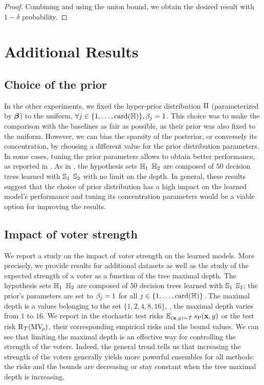 \begin{noaddcontents}
\begin{proof}
Combining  and  using the union bound, we obtain the desired result with $1-\delta$ probability.
\end{proof}

\section{Additional Results}
\label{ap:mv-sto:sec:result}

\subsection{Choice of the prior}
In the other experiments, we fixed the hyper-prior distribution $\hyperP$ (parameterized by $\paramDirP$) to the uniform, \ie $\forall j\in\{1,\dots,\card(\H)\}, \sparamDirP_j = 1$.
This choice was to make the comparison with the baselines as fair as possible, as their prior was also fixed to the uniform.
However, we can bias the sparsity of the posterior, or conversely its concentration, by choosing a different value for the prior distribution parameters.
In some cases, tuning the prior parameters allows to obtain better performance, as reported in .
As in , the hypothesis sets $\H_1$ \resp $\H_2$ are composed of $50$ decision trees learned with $\S_1$ \resp $\S_2$ with no limit on the depth.
In general, these results suggest that the choice of prior distribution has a high impact on the learned model's performance and tuning its concentration parameters would be a viable option for improving the results.

\subsection{Impact of voter strength}
We report a study on the impact of voter strength on the learned models.
More precisely, we provide results for additional datasets as well as the study of the expected strength of a voter as a function of the tree maximal depth.
The hypothesis sets $\H_1$ \resp $\H_2$ are composed of $50$ decision trees learned with $\S_1$ \resp $\S_2$; the prior's parameters are set to $\sparamDirP_j = 1$ for all $j\in\{1,\dots,\card(\H)\}$.
The maximal depth is a values belonging to the set $\{1, 2, 4, 8, 16\}$, \ie, the maximal depth varies from $1$ to $16$.
We report in  the stochastic test risks $\EE_{(\x,\y)\sim\dT}s_{\hyperQ}(\x, \y)$ or the test risk $\Risk_{\dT}(\MVQ)$, their corresponding empirical risks and the bound values.
We can see that limiting the maximal depth is an effective way for controlling the strength of the voters.
Indeed, the general trend tells us that increasing the strength of the voters generally yields more powerful ensembles for all methods: the risks and the bounds are decreasing or stay constant when the tree maximal depth is increasing.


\end{noaddcontents}
